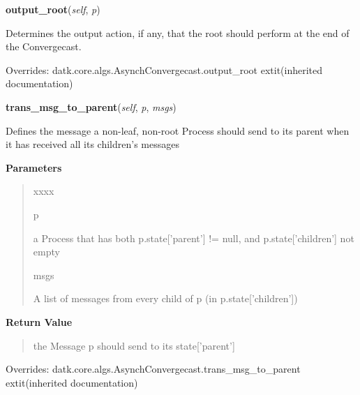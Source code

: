     \vspace{0.5ex}

\hspace{.8\funcindent}\begin{boxedminipage}{\funcwidth}

    \raggedright \textbf{output\_root}(\textit{self}, \textit{p})

\setlength{\parskip}{2ex}
    Determines the output action, if any, that the root should perform at 
    the end of the Convergecast.

\setlength{\parskip}{1ex}
      Overrides: datk.core.algs.AsynchConvergecast.output\_root 	extit{(inherited documentation)}

    \end{boxedminipage}

    \vspace{0.5ex}

\hspace{.8\funcindent}\begin{boxedminipage}{\funcwidth}

    \raggedright \textbf{trans\_msg\_to\_parent}(\textit{self}, \textit{p}, \textit{msgs})

\setlength{\parskip}{2ex}
    Defines the message a non-leaf, non-root Process should send to its 
    parent when it has received all its children's messages

\setlength{\parskip}{1ex}
      \textbf{Parameters}
      \vspace{-1ex}

      \begin{quote}
        \begin{Ventry}{xxxx}

          \item[p]

          a Process that has both p.state['parent'] != null, and 
          p.state['children'] not empty

          \item[msgs]

          A list of messages from every child of p (in p.state['children'])

        \end{Ventry}

      \end{quote}

      \textbf{Return Value}
    \vspace{-1ex}

      \begin{quote}
      the Message p should send to its state['parent']

      \end{quote}

      Overrides: datk.core.algs.AsynchConvergecast.trans\_msg\_to\_parent 	extit{(inherited documentation)}

    \end{boxedminipage}

